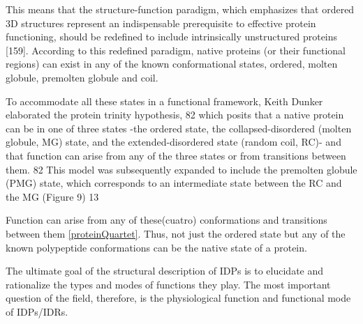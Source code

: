 This means that the structure-function paradigm, which emphasizes that ordered 3D structures represent an indispensable prerequisite to effective protein functioning, should be redefined to include intrinsically unstructured proteins [159]. 
According to this redefined paradigm, native proteins (or their functional regions) can exist in any of the known conformational states, ordered, molten globule, premolten globule and coil. 

To accommodate all these states in a functional framework, Keith Dunker elaborated the protein trinity hypothesis, 82 which posits that a native protein can be in one of three states -the ordered state, the collapsed-disordered
(molten globule, MG) state, and the extended-disordered state (random coil, RC)- and that function can arise from any of the
three states or from transitions between them. 82 This model was subsequently expanded to include the premolten globule (PMG)
state, which corresponds to an intermediate state between the RC and the MG (Figure 9) 13

Function can arise from any of these(cuatro) conformations and transitions between them \ref{proteinQuartet}. Thus, not just the ordered state but any of the known polypeptide conformations can be the native state of a protein.

The ultimate goal of the structural description of IDPs is to elucidate and rationalize the types and modes of functions they play.
The most important question of the field, therefore, is the physiological function and functional mode of IDPs/IDRs.




